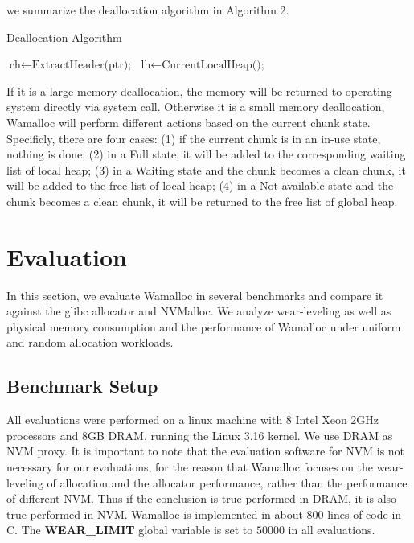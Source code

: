 \documentclass[10pt, conference, compsocconf]{IEEEtran}
\begin{document}
we summarize the deallocation algorithm in Algorithm 2.

\begin{algorithm}
\caption{Deallocation Algorithm}\label{euclid}
\begin{algorithmic}[1]

\State $\text{ch} \gets \text{ExtractHeader(ptr);}$
\State $\text{lh} \gets \text{CurrentLocalHeap();}$

\State {}
\Else
\State {}
\EndIf

\EndProcedure
\end{algorithmic}
\end{algorithm}

If it is a large memory deallocation, the memory will be returned to operating system directly via system call.
Otherwise it is a small memory deallocation, Wamalloc will perform different actions based on the current chunk state.
Specificly, there are four cases:
(1) if the current chunk is in an in-use state, nothing is done;
(2) in a Full state, it will be added to the corresponding waiting list of local heap;
(3) in a Waiting state and the chunk becomes a clean chunk, it will be added to the free list of local heap;
(4) in a Not-available state and the chunk becomes a clean chunk, it will be returned to the free list of global heap.

\section{Evaluation}

In this section, we evaluate Wamalloc in several benchmarks and compare it against the glibc allocator and NVMalloc\cite{moraru2013consistent}.
We analyze wear-leveling as well as physical memory consumption and the performance of Wamalloc under uniform and random allocation workloads.

\subsection{Benchmark Setup}

All evaluations were performed on a linux machine with 8 Intel Xeon 2GHz processors and 8GB DRAM, running the Linux 3.16 kernel.
We use DRAM as NVM proxy. It is important to note that the evaluation software for NVM is not necessary for our evaluations, for the reason that Wamalloc focuses on the wear-leveling of allocation and the allocator performance, rather than the performance of different NVM.
Thus if the conclusion is true performed in DRAM, it is also true performed in NVM.
Wamalloc is implemented in about 800 lines of code in C.
The \textbf{WEAR\_LIMIT} global variable is set to $50000$ in all evaluations.
\end{document}
